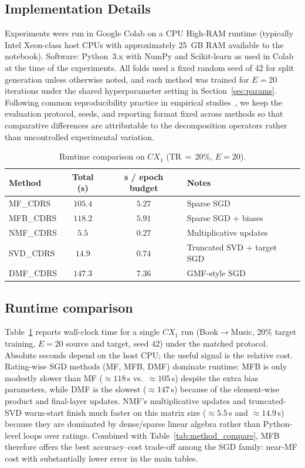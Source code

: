 \documentclass[pdflatex,sn-mathphys-num]{sn-jnl}%
\theoremstyle{thmstyleone}%
\theoremstyle{thmstyletwo}%
\theoremstyle{thmstylethree}%
\begin{document}
\subsection{Implementation Details}
Experiments were run in Google Colab on a CPU High-RAM runtime (typically Intel Xeon-class host CPUs with approximately 25~GB RAM available to the notebook). Software: Python~3.x with NumPy and Scikit-learn as used in Colab at the time of the experiments. All folds used a fixed random seed of $42$ for split generation unless otherwise noted, and each method was trained for $E=20$ iterations under the shared hyperparameter setting in Section~\ref{sec:params}. Following common reproducibility practice in empirical studies~\cite{briels2024reproducibility}, we keep the evaluation protocol, seeds, and reporting format fixed across methods so that comparative differences are attributable to the decomposition operators rather than uncontrolled experimental variation.

\begin{table}[!htbp]
\centering
\caption{Runtime comparison on $CX_1$ (TR\,$=$\,20\%, $E=20$).}
\label{tab:runtime}
\renewcommand{\arraystretch}{1.15}
\small
\begin{tabularx}{\textwidth}{>{\raggedright\arraybackslash}X c c >{\raggedright\arraybackslash}X}
\toprule
\textbf{Method} & \textbf{Total (s)} & \textbf{s / epoch budget} & \textbf{Notes} \\
\midrule
MF\_CDRS & $105.4$ & $5.27$ & Sparse SGD \\
MFB\_CDRS & $118.2$ & $5.91$ & Sparse SGD $+$ biases \\
NMF\_CDRS & $5.5$ & $0.27$ & Multiplicative updates \\
SVD\_CDRS & $14.9$ & $0.74$ & Truncated SVD $+$ target SGD \\
DMF\_CDRS & $147.3$ & $7.36$ & GMF-style SGD \\
\bottomrule
\end{tabularx}
\end{table}

\subsection{Runtime comparison}\label{sec:runtime}
Table~\ref{tab:runtime} reports wall-clock time for a single $CX_1$ run (Book$\to$Music, 20\% target training, $E=20$ source and target, seed $42$) under the matched protocol. Absolute seconds depend on the host CPU; the useful signal is the relative cost. Rating-wise SGD methods (MF, MFB, DMF) dominate runtime: MFB is only modestly slower than MF ($\approx 118$\,s vs.\ $\approx 105$\,s) despite the extra bias parameters, while DMF is the slowest ($\approx 147$\,s) because of the element-wise product and final-layer updates. NMF's multiplicative updates and truncated-SVD warm-start finish much faster on this matrix size ($\approx 5.5$\,s and $\approx 14.9$\,s) because they are dominated by dense/sparse linear algebra rather than Python-level loops over ratings. Combined with Table~\ref{tab:method_compare}, MFB therefore offers the best accuracy--cost trade-off among the SGD family: near-MF cost with substantially lower error in the main tables.
\end{document}
